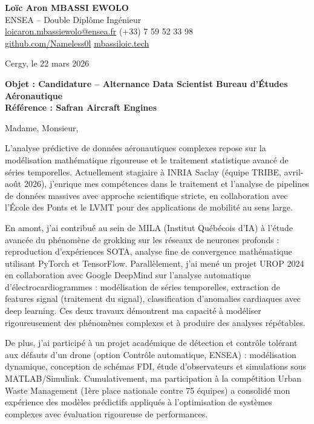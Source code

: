 \documentclass[a4paper,11pt]{article}
\begin{document}
\noindent
\textbf{Lo\"ic Aron MBASSI EWOLO} \\
ENSEA -- Double Dipl\^ome Ing\'enieur \\
\href{mailto:loicaron.mbassiewolo@ensea.fr}{loicaron.mbassiewolo@ensea.fr} \quad (+33) 7 59 52 33 98 \\
\href{https://github.com/Nameless0l}{github.com/Nameless0l} \quad \href{https://mbassiloic.tech}{mbassiloic.tech}

\vspace{1em}
\noindent Cergy, le 22 mars 2026

\vspace{1em}
\noindent
\textbf{Objet : Candidature -- Alternance Data Scientist Bureau d'\'Etudes A\'eronautique} \\
\textbf{R\'ef\'erence : Safran Aircraft Engines}

\vspace{1.5em}
\noindent Madame, Monsieur,

L'analyse pr\'edictive de donn\'ees a\'eronautiques complexes repose sur la mod\'elisation math\'ematique rigoureuse et le traitement statistique avanc\'e de s\'eries temporelles. Actuellement stagiaire \`a INRIA Saclay (\'equipe TRIBE, avril-ao\^ut 2026), j'enrique mes comp\'etences dans le traitement et l'analyse de pipelines de donn\'ees massives avec approche scientifique stricte, en collaboration avec l'\'Ecole des Ponts et le LVMT pour des applications de mobilit\'e au sens large.

\vspace{0.8em}

En amont, j'ai contribu\'e au sein de MILA (Institut Québécois d'IA) \`a l'\'etude avanc\'ee du ph\'enom\`ene de grokking sur les r\'eseaux de neurones profonds : reproduction d'exp\'eriences SOTA, analyse fine de convergence math\'ematique utilisant PyTorch et TensorFlow. Parallèlement, j'ai men\'e un projet UROP 2024 en collaboration avec Google DeepMind sur l'analyse automatique d'\'electrocardiogrammes : mod\'elisation de s\'eries temporelles, extraction de features signal (traitement du signal), classification d'anomalies cardiaques avec deep learning. Ces deux travaux d\'emontrent ma capacit\'e \`a modéliser rigoureusement des ph\'enom\`enes complexes et \`a produire des analyses r\'ep\'etables.

\vspace{0.8em}

De plus, j'ai particip\'e \`a un projet acad\'emique de d\'etection et contrôle tol\'erant aux d\'efauts d'un drone (option Contr\^ole automatique, ENSEA) : mod\'elisation dynamique, conception de sch\'emas FDI, \'etude d'observateurs et simulations sous MATLAB/Simulink. Cumulativement, ma participation \`a la comp\'etition Urban Waste Management (1ère place nationale contre 75 \'equipes) a consolid\'e mon exp\'erience des mod\`eles pr\'edictifs appliqu\'es \`a l'optimisation de syst\`emes complexes avec \'evaluation rigoureuse de performances.
\end{document}
